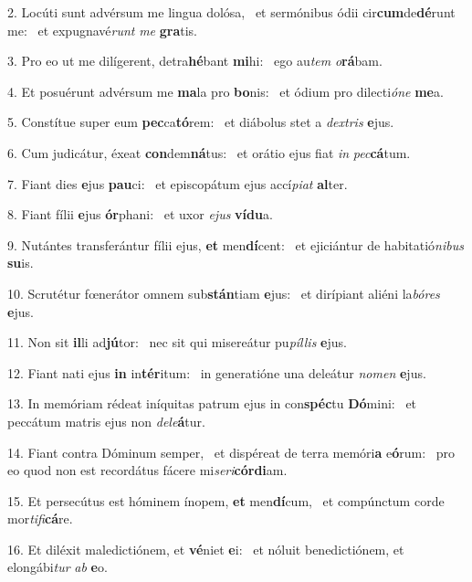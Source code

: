 2. Locúti sunt advérsum me lingua dolósa, \dag\  et sermónibus ódii cir\textbf{cum}de\textbf{dé}runt me: \ast\  et expugnavé\textit{runt} \textit{me} \textbf{gra}tis.\

3. Pro eo ut me dilígerent, detra\textbf{hé}bant \textbf{mi}hi: \ast\  ego au\textit{tem} \textit{o}\textbf{rá}bam.\

4. Et posuérunt advérsum me \textbf{ma}la pro \textbf{bo}nis: \ast\  et ódium pro dilecti\textit{ó}\textit{ne} \textbf{me}a.\

5. Constítue super eum \textbf{pec}ca\textbf{tó}rem: \ast\  et diábolus stet a \textit{dex}\textit{tris} \textbf{e}jus.\

6. Cum judicátur, éxeat \textbf{con}dem\textbf{ná}tus: \ast\  et orátio ejus fiat \textit{in} \textit{pec}\textbf{cá}tum.\

7. Fiant dies \textbf{e}jus \textbf{pau}ci: \ast\  et episcopátum ejus accí\textit{pi}\textit{at} \textbf{al}ter.\

8. Fiant fílii \textbf{e}jus \textbf{ór}phani: \ast\  et uxor \textit{e}\textit{jus} \textbf{ví}\textbf{du}a.\

9. Nutántes transferántur fílii ejus, \textbf{et} men\textbf{dí}cent: \ast\  et ejiciántur de habitatió\textit{ni}\textit{bus} \textbf{su}is.\

10. Scrutétur fœnerátor omnem sub\textbf{stán}tiam \textbf{e}jus: \ast\  et dirípiant aliéni la\textit{bó}\textit{res} \textbf{e}jus.\

11. Non sit \textbf{il}li ad\textbf{jú}tor: \ast\  nec sit qui misereátur pu\textit{píl}\textit{lis} \textbf{e}jus.\

12. Fiant nati ejus \textbf{in} in\textbf{tér}itum: \ast\  in generatióne una deleátur \textit{no}\textit{men} \textbf{e}jus.\

13. In memóriam rédeat iníquitas patrum ejus in con\textbf{spéc}tu \textbf{Dó}mini: \ast\  et peccátum matris ejus non \textit{de}\textit{le}\textbf{á}tur.\

14. Fiant contra Dóminum semper, \dag\  et dispéreat de terra memóri\textbf{a} e\textbf{ó}rum: \ast\  pro eo quod non est recordátus fácere mi\textit{se}\textit{ri}\textbf{cór}\textbf{di}am.\

15. Et persecútus est hóminem ínopem, \textbf{et} men\textbf{dí}cum, \ast\  et compúnctum corde mor\textit{ti}\textit{fi}\textbf{cá}re.\

16. Et diléxit maledictiónem, et \textbf{vé}niet \textbf{e}i: \ast\  et nóluit benedictiónem, et elongábi\textit{tur} \textit{ab} \textbf{e}o.\

